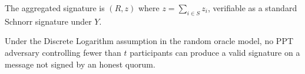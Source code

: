 The aggregated signature is $(R, z)$ where $z = \sum_{i \in S} z_i$, verifiable as a standard Schnorr signature under $Y$.

\begin{theorem}[$t$-of-$n$ Unforgeability]
\label{thm:frost-security}
Under the Discrete Logarithm assumption in the random oracle model, no PPT adversary controlling fewer than $t$ participants can produce a valid \FROST{} signature on a message not signed by an honest quorum.
\end{theorem}

